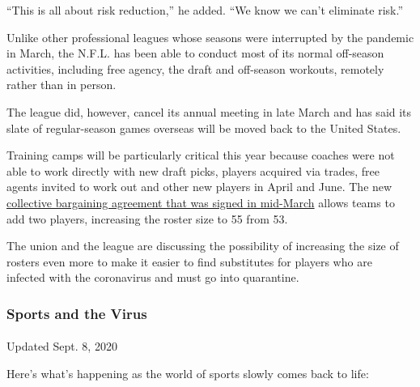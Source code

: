 ``This is all about risk reduction,'' he added. ``We know we can't
eliminate risk.''

Unlike other professional leagues whose seasons were interrupted by the
pandemic in March, the N.F.L. has been able to conduct most of its
normal off-season activities, including free agency, the draft and
off-season workouts, remotely rather than in person.

The league did, however, cancel its annual meeting in late March and has
said its slate of regular-season games overseas will be moved back to
the United States.

Training camps will be particularly critical this year because coaches
were not able to work directly with new draft picks, players acquired
via trades, free agents invited to work out and other new players in
April and June. The new
\href{https://www.nytimes3xbfgragh.onion/2020/03/15/sports/football/nfl-cba-approved.html}{collective
bargaining agreement that was signed in mid-March} allows teams to add
two players, increasing the roster size to 55 from 53.

The union and the league are discussing the possibility of increasing
the size of rosters even more to make it easier to find substitutes for
players who are infected with the coronavirus and must go into
quarantine.

\hypertarget{sports-and-the-virus}{%
\subsubsection{Sports and the Virus}\label{sports-and-the-virus}}

\paragraph{}

Updated Sept. 8, 2020

Here's what's happening as the world of sports slowly comes back to
life:

